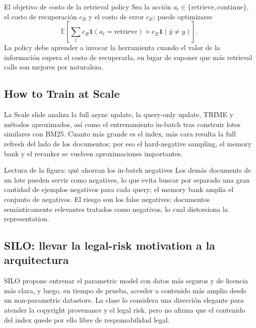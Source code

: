 
\begin{importantbox}{El objetivo de costo de la retrieval policy}
Sea la acción $a_t\in\{\text{retrieve},\text{continue}\}$, el costo de recuperación $c_R$ y el costo de error $c_E$; puede optimizarse
\[
\mathbb{E}\!\left[\sum_t c_R\mathbf{1}(a_t=\text{retrieve})
+c_E\mathbf{1}(\hat y\ne y)\right].
\]
La policy debe aprender a invocar la herramienta cuando el valor de la información supera el costo de recuperarla, en lugar de suponer que más retrieval calls son mejores por naturaleza.
\end{importantbox}

\subsection{How to Train at Scale}

La Scale slide analiza la full async update, la query-only update, TRIME y métodos aproximados, así como el entrenamiento in-batch tras construir lotes similares con BM25. Cuanto más grande es el index, más cara resulta la full refresh del lado de los documentos; por eso el hard-negative sampling, el memory bank y el reranker se vuelven aproximaciones importantes.


\begin{knowledgebox}{Lectura de la figura: qué ahorran los in-batch negatives}
Los demás documents de un lote pueden servir como negatives, lo que evita buscar por separado una gran cantidad de ejemplos negativos para cada query; el memory bank amplía el conjunto de negativos. El riesgo son los false negatives: documentos semánticamente relevantes tratados como negativos, lo cual distorsiona la representation.
\end{knowledgebox}

\subsection{SILO: llevar la legal-risk motivation a la arquitectura}

SILO propone entrenar el parametric model con datos más seguros y de licencia más clara, y luego, en tiempo de prueba, acceder a contenido más amplio desde un non-parametric datastore. La clase lo considera una dirección elegante para atender la copyright provenance y el legal risk, pero no afirma que el contenido del index quede por ello libre de responsabilidad legal.

